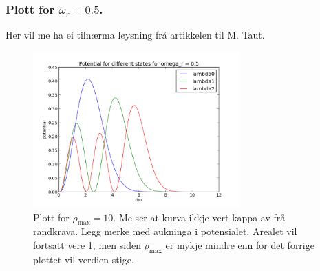 \documentclass[11pt, a4paper]{article}
\begin{document}
    \subsubsection{Plott for $\omega_r = 0.5$.}
      Her vil me ha ei tilnærma løysning frå artikkelen til M. Taut. 
      \begin{figure}[H]
        \centering
        \includegraphics[width=300px]{omega05.png}
        \caption{Plott for $\rho_{\text{max}} = 10$. Me ser at kurva ikkje vert kappa av frå randkrava. Legg merke med aukninga i potensialet. Arealet vil fortsatt vere 1, men 
        siden $\rho_{\text{max}}$ er mykje mindre enn for det forrige plottet vil verdien stige.}
      \end{figure}
\end{document}
